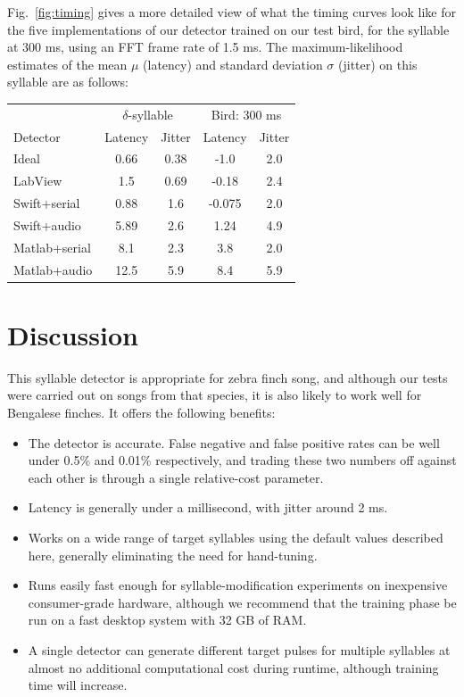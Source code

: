 \documentclass[10pt,letterpaper]{article}
\newcommand\fig[1]{Fig.~\ref{#1}}
\begin{document}
\fig{fig:timing} gives a more detailed view of what the timing curves look like for the five implementations of our detector trained on our test bird, for the syllable at 300 ms, using an FFT frame rate of 1.5 ms.  The maximum-likelihood estimates of the mean $\mu$ (latency) and standard deviation $\sigma$ (jitter) on this syllable are as follows:

\vspace{8pt}
\begin{tabular}{l|c|c|c| c}
  & \multicolumn{2}{c}{$\delta$-syllable} & \multicolumn{2}{c}{Bird: 300 ms} \\
  Detector & Latency & Jitter & Latency & Jitter \\
  \hline
  Ideal & 0.66 & 0.38 & -1.0 & 2.0 \\
  LabView & 1.5 & 0.69 & -0.18 & 2.4 \\
  Swift+serial & 0.88 & 1.6 & -0.075 & 2.0 \\
  Swift+audio & 5.89 & 2.6 & 1.24 & 4.9 \\
  Matlab+serial & 8.1 & 2.3 & 3.8 & 2.0 \\
  Matlab+audio & 12.5 & 5.9 & 8.4 & 5.9
\end{tabular}

\vspace{8pt}

\section{Discussion}
\label{sec:conclusion}

This syllable detector is appropriate for zebra finch song, and although our tests were carried out on songs from that species, it is also likely to work well for Bengalese finches.  It offers the following benefits:
\begin{itemize}
\item The detector is accurate. False negative and
  false positive rates can be well under 0.5\% and 0.01\% respectively, and trading these two numbers off against each other is through a single relative-cost parameter.
\item Latency is generally under a millisecond, with jitter around 2 ms.
\item Works on a wide range of target syllables using the default values described here, generally eliminating the need for hand-tuning.
\item Runs easily fast enough for syllable-modification experiments on inexpensive consumer-grade hardware, although we recommend that the training phase be run on a fast desktop system with 32 GB of RAM.
\item A single detector can generate different target pulses for multiple syllables at almost no additional computational cost during runtime, although training time will increase.
\end{itemize}
\end{document}
